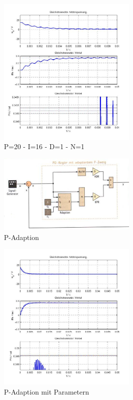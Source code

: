 \begin{figure}[ht]
	\centering
	\includegraphics[width=0.6\textwidth]{PID-P20I16D1N1.jpg}
	\caption{P=20 - I=16 - D=1 - N=1}
	\label{p2oi16d1n1}
\end{figure}


\begin{figure}[ht]
	\centering
	\includegraphics[width=0.6\textwidth]{P-Adaption.jpg}
	\caption{P-Adaption}
	\label{padaption}
\end{figure}


\begin{figure}[ht]
	\centering
	\includegraphics[width=0.6\textwidth]{Pad-P41F1_1,5F2_80.jpg}
	\caption{P-Adaption mit Parametern}
	\label{padp41f1580}
\end{figure}


